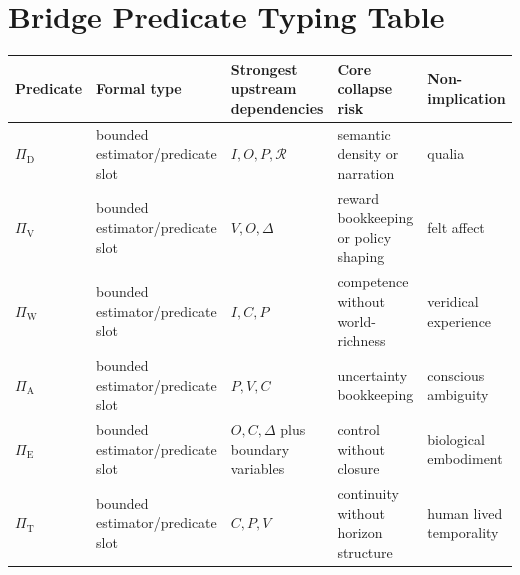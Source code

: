 \documentclass[11pt,a4paper]{article}
\theoremstyle{definition}
\newcommand{\SelfIndex}{I}
\newcommand{\OwnField}{O}
\newcommand{\ContField}{C}
\newcommand{\Persp}{P}
\newcommand{\ValAsym}{V}
\newcommand{\IntervProf}{\Delta}
\newcommand{\Irred}{\mathcal{R}}
\newcommand{\PiD}{\Pi_{\mathrm{D}}}
\newcommand{\PiV}{\Pi_{\mathrm{V}}}
\newcommand{\PiW}{\Pi_{\mathrm{W}}}
\newcommand{\PiA}{\Pi_{\mathrm{A}}}
\newcommand{\PiE}{\Pi_{\mathrm{E}}}
\newcommand{\PiT}{\Pi_{\mathrm{T}}}
\begin{document}
\section{Bridge Predicate Typing Table}
\begin{center}
\small
\begin{tabularx}{\linewidth}{@{}>{\raggedright\arraybackslash}p{}>{\raggedright\arraybackslash}p{}>{\raggedright\arraybackslash}p{}>{\raggedright\arraybackslash}p{}>{\raggedright\arraybackslash}p{}@{}}
\toprule
Predicate & Formal type & Strongest upstream dependencies & Core collapse risk & Non-implication \\
\midrule
$\PiD$ & bounded estimator/predicate slot & $\SelfIndex,\OwnField,\Persp,\Irred$ & semantic density or narration & qualia \\
$\PiV$ & bounded estimator/predicate slot & $\ValAsym,\OwnField,\IntervProf$ & reward bookkeeping or policy shaping & felt affect \\
$\PiW$ & bounded estimator/predicate slot & $\SelfIndex,\ContField,\Persp$ & competence without world-richness & veridical experience \\
$\PiA$ & bounded estimator/predicate slot & $\Persp,\ValAsym,\ContField$ & uncertainty bookkeeping & conscious ambiguity \\
$\PiE$ & bounded estimator/predicate slot & $\OwnField,\ContField,\IntervProf$ plus boundary variables & control without closure & biological embodiment \\
$\PiT$ & bounded estimator/predicate slot & $\ContField,\Persp,\ValAsym$ & continuity without horizon structure & human lived temporality \\
\bottomrule
\end{tabularx}
\end{center}
\end{document}
